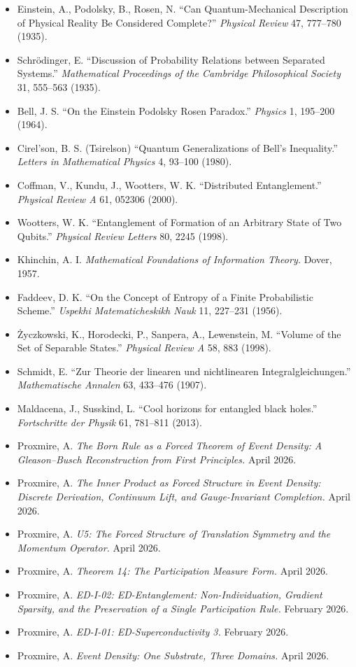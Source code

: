 \documentclass[11pt,a4paper]{article}
\begin{document}
\begin{itemize}[leftmargin=*,itemsep=2pt]
  \item Einstein, A., Podolsky, B., Rosen, N. ``Can Quantum-Mechanical Description of Physical Reality Be Considered Complete?'' \emph{Physical Review} 47, 777--780 (1935).
  \item Schr\"odinger, E. ``Discussion of Probability Relations between Separated Systems.'' \emph{Mathematical Proceedings of the Cambridge Philosophical Society} 31, 555--563 (1935).
  \item Bell, J. S. ``On the Einstein Podolsky Rosen Paradox.'' \emph{Physics} 1, 195--200 (1964).
  \item Cirel'son, B. S. (Tsirelson) ``Quantum Generalizations of Bell's Inequality.'' \emph{Letters in Mathematical Physics} 4, 93--100 (1980).
  \item Coffman, V., Kundu, J., Wootters, W. K. ``Distributed Entanglement.'' \emph{Physical Review A} 61, 052306 (2000).
  \item Wootters, W. K. ``Entanglement of Formation of an Arbitrary State of Two Qubits.'' \emph{Physical Review Letters} 80, 2245 (1998).
  \item Khinchin, A. I. \emph{Mathematical Foundations of Information Theory.} Dover, 1957.
  \item Faddeev, D. K. ``On the Concept of Entropy of a Finite Probabilistic Scheme.'' \emph{Uspekhi Matematicheskikh Nauk} 11, 227--231 (1956).
  \item \.Zyczkowski, K., Horodecki, P., Sanpera, A., Lewenstein, M. ``Volume of the Set of Separable States.'' \emph{Physical Review A} 58, 883 (1998).
  \item Schmidt, E. ``Zur Theorie der linearen und nichtlinearen Integralgleichungen.'' \emph{Mathematische Annalen} 63, 433--476 (1907).
  \item Maldacena, J., Susskind, L. ``Cool horizons for entangled black holes.'' \emph{Fortschritte der Physik} 61, 781--811 (2013).
  \item Proxmire, A. \emph{The Born Rule as a Forced Theorem of Event Density: A Gleason--Busch Reconstruction from First Principles.} April 2026.
  \item Proxmire, A. \emph{The Inner Product as Forced Structure in Event Density: Discrete Derivation, Continuum Lift, and Gauge-Invariant Completion.} April 2026.
  \item Proxmire, A. \emph{U5: The Forced Structure of Translation Symmetry and the Momentum Operator.} April 2026.
  \item Proxmire, A. \emph{Theorem 14: The Participation Measure Form.} April 2026.
  \item Proxmire, A. \emph{ED-I-02: ED-Entanglement: Non-Individuation, Gradient Sparsity, and the Preservation of a Single Participation Rule.} February 2026.
  \item Proxmire, A. \emph{ED-I-01: ED-Superconductivity 3.} February 2026.
  \item Proxmire, A. \emph{Event Density: One Substrate, Three Domains.} April 2026.
\end{itemize}
\end{document}
